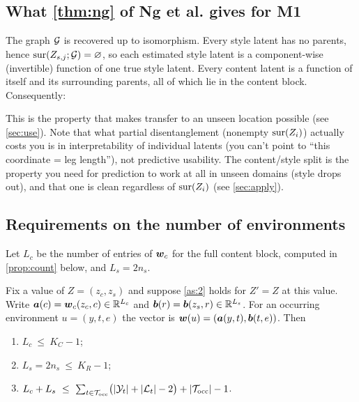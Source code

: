 \subsection{What \texorpdfstring{\cref{thm:ng}}{Theorem~\ref*{thm:ng}} of Ng et al. gives for M1}
The graph $\mathcal{G}$ is recovered up to isomorphism. Every style latent has no parents, hence \linebreak
\mbox{$\mathrm{sur}(Z_{s,j};\mathcal{G})=\varnothing$}, so each estimated style latent is a component-wise (invertible)
function of one true style latent. Every content latent is a function of itself and its surrounding
parents, all of which lie in the content block. Consequently:
\begin{center}
\end{center}
This is the property that makes transfer to an unseen location possible (see \cref{sec:use}).
Note that what partial disentanglement (nonempty $\mathrm{sur}(Z_i)$) actually costs you is in interpretability 
of individual latents (you can't point to ``this coordinate = leg length''), not predictive usability. 
The content/style split is the property you need for prediction to work at all in unseen domains 
(style drops out), and that one is clean regardless of $\mathrm{sur}(Z_i)$ (see \cref{sec:apply}).

\subsection{Requirements on the number of environments}
\label{sec:reqs}
Let $L_c$ be the number of entries of $\boldsymbol{w}_c$ for the full content block, computed in
\cref{prop:count} below, and $L_s=2n_s$.

\begin{proposition}\label{prop:m1req}
Fix a value of $Z=(z_c,z_s)$ and suppose \cref{as:2} holds for $Z'=Z$ at this value. Write
$\boldsymbol{a}(c)=\boldsymbol{w}_c(z_c,c)\in\mathbb{R}^{L_c}$ and $\boldsymbol{b}(r)=\boldsymbol{b}(z_s,r)\in\mathbb{R}^{L_s}$. For an occurring
environment $u=(y,t,e)$ the vector is $\boldsymbol{w}(u)=(\boldsymbol{a}(y,t),\boldsymbol{b}(t,e))$. Then
\begin{enumerate}[label=(\alph*),leftmargin=2em]
\item \label{item:Lc} $L_c\ \le\ K_C-1$;
\item \label{item:Ls} $L_s=2n_s\ \le\ K_R-1$;
\item \label{item:Lc+Ls} $L_c+L_s\ \le\ \sum_{t\in\Tset_{\mathrm{occ}}}\bigl(|\Yset_t|+|\Lset_t|-2\bigr)+|\Tset_{\mathrm{occ}}|-1$.
\end{enumerate}
\end{proposition}

